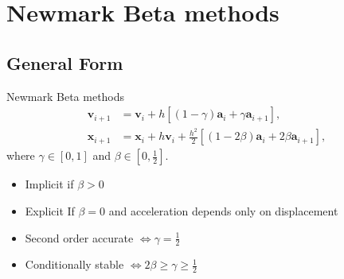 \documentclass{beamer}
\renewcommand{\vec}[1]{\mathbf{#1}}
\begin{document}
\section{Newmark Beta methods}

\subsection{General Form}
\begin{frame}[t]{Newmark Beta methods}
\begin{align*}
		\vec{v}_{i+1} & = \vec{v}_{i} + h\left[\left(1-\gamma \right)\vec{a}_{i} + \gamma \vec{a}_{i+1}\right], \\
		\vec{x}_{i+1} & = \vec{x}_{i} + h\vec{v}_{i} + \frac{h^2}{2}\left[ \left(1-2\beta \right)\vec{a}_{i} + 2\beta \vec{a}_{i+1}\right] ,
\end{align*} where $\gamma \in \left[0, 1 \right]$ and $\beta \in \left[0, \frac{1}{2} \right]$.
\bigskip
\begin{itemize}
	\item
	Implicit if $\beta > 0$
	\item
	Explicit If $\beta = 0$ and acceleration depends only on displacement
	\item 
	Second order accurate $\Leftrightarrow \gamma = \frac{1}{2}$
	\item
	Conditionally stable \quad $\Leftrightarrow 2\beta \geq \gamma \geq \frac{1}{2}$
\end{itemize}
\end{frame}
\end{document}
